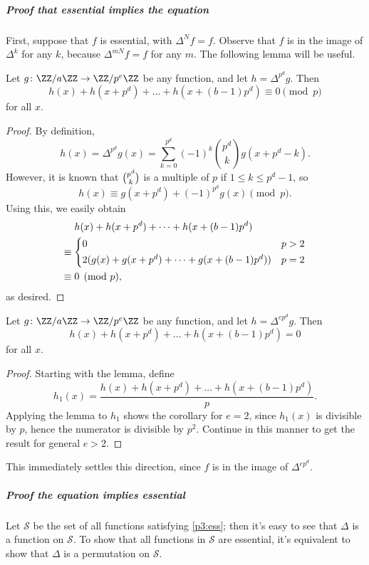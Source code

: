 \documentclass[11pt]{scrartcl}
\begin{document}
\subparagraph{Proof that essential implies the equation}
First, suppose that $f$ is essential, with $\Delta^N f = f$.
Observe that $f$ is in the image of $\Delta^k$ for any $k$, because $\Delta^{mN} f = f$ for any $m$.
The following lemma will be useful.
\begin{lemma*}
  Let $g \colon \ZZ/a\ZZ \to \ZZ/p^e\ZZ$ be any function, and let $h = \Delta^{p^d} g$. Then
  \[ h(x) + h(x + p^d) + \dots + h(x + (b-1)p^d) \equiv 0 \pmod p \]
  for all $x$.
\end{lemma*}
\begin{proof}
  By definition,
  \[ h(x) = \Delta^{p^d} g(x) = \sum_{k = 0}^{p^d} (-1)^k \binom{p^d}k g(x + p^d - k). \]
  However, it is known that $\tbinom{p^d}k$ is a multiple of $p$ if $1 \le k \le p^d - 1$, so
  \[ h(x) \equiv g(x + p^d) + (-1)^{p^d} g(x) \pmod p. \]
  Using this, we easily obtain
  \begin{align*}
    & \phantom{\equiv}\;\; h(x) + h(x + p^d) + \dots + h(x + (b-1)p^d)\\
    & \equiv
    \begin{cases*}
      0 & $p > 2$\\
      2(g(x) + g(x + p^d) + \dots + g(x + (b-1)p^d)) & $p = 2$
    \end{cases*}\\
    & \equiv 0 \pmod p,
  \end{align*}
  as desired.
\end{proof}

\begin{corollary*}
  Let $g \colon \ZZ/a\ZZ \to \ZZ/p^e\ZZ$ be any function, and let $h = \Delta^{ep^d} g$. Then
  \[ h(x) + h(x + p^d) + \dots + h(x + (b-1)p^d) = 0 \]
  for all $x$.
\end{corollary*}
\begin{proof}
  Starting with the lemma, define
  \[ h_1(x) = \frac{h(x) + h(x  + p^d) + \dots + h(x + (b-1)p^d)}{p}. \]
  Applying the lemma to $h_1$ shows the corollary for $e=2$,
  since $h_1(x)$ is divisible by $p$, hence the numerator is divisible by $p^2$.
  Continue in this manner to get the result for general $e > 2$.
\end{proof}
This immediately settles this direction, since $f$ is in the image of $\Delta^{ep^d}$.

\subparagraph{Proof the equation implies essential}
Let $\mathcal S$ be the set of all functions satisfying \ref{p3:ess};
then it's easy to see that $\Delta$ is a function on $\mathcal S$.
To show that all functions in $\mathcal S$ are essential,
it's equivalent to show that $\Delta$ is a permutation on $\mathcal S$.
\end{document}
